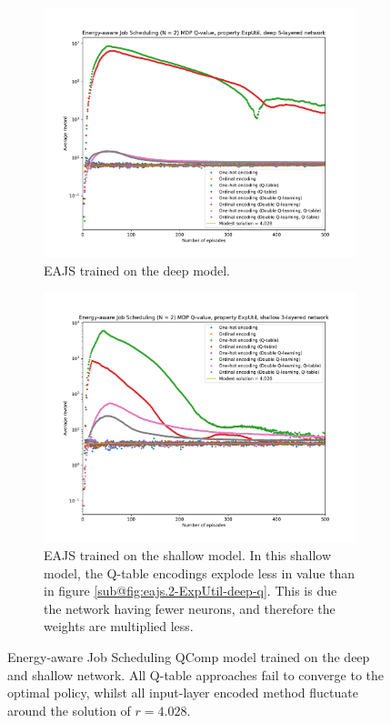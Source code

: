 \begin{figure}
    \centering
    \begin{subfigure}[b]{0.9\textwidth}
        \centering
        \includegraphics[width=\textwidth]{plot/eajs.2-ExpUtil-q.pdf}
        \caption{EAJS trained on the deep model.}
        \label{fig:eajs.2-ExpUtil-deep-q}
    \end{subfigure}
    \vfill
    \begin{subfigure}[b]{0.9\textwidth}
        \centering
        \includegraphics[width=\textwidth]{plot/eajs.2-ExpUtil-fc128-q.pdf}
        \caption{EAJS trained on the shallow model. In this shallow model, the Q-table encodings explode less in value than in figure \ref{sub@fig:eajs.2-ExpUtil-deep-q}. This is due the network having fewer neurons, and therefore the weights are multiplied less.}
        \label{fig:eajs.2-ExpUtil-shallow-q}
    \end{subfigure}
    \caption{Energy-aware Job Scheduling QComp model trained on the deep and shallow network. All Q-table approaches fail to converge to the optimal policy, whilst all input-layer encoded method fluctuate around the solution of $r = 4.028$.}
    \label{fig:eajs.2-ExpUtil-q}
\end{figure}


